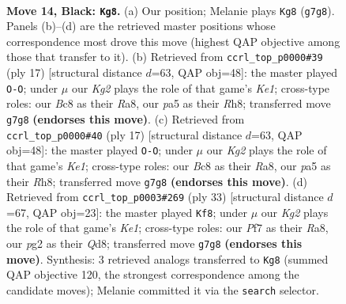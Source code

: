 \documentclass[11pt]{article}
\begin{document}
\clearpage

\begin{figure}[p]\centering
\begin{subfigure}{0.46\textwidth}\centering
\resizebox{\linewidth}{!}{%
\newchessgame
\chessboard[
  setfen={1rbqr3/p1p2pkp/2pp1n2/P3p3/4P3/2PP1N2/2P2PP1/R1BQ1RK1 b - - 0 14},
  showmover=false,
  pgfstyle=straightmove, color=movearrow, markmove={g7-g8}
]}
\caption{}
\end{subfigure}\hfill
\begin{subfigure}{0.46\textwidth}\centering
\resizebox{\linewidth}{!}{%
\newchessgame
\chessboard[
  setfen={r1b1k2r/p1p1qppp/2pp1n2/4p3/4P3/2PP1N1P/P1P2PP1/R1BQ1RK1 b kq - 0 9},
  showmover=false,
  pgfstyle=straightmove, color=movearrow, markmove={e8-g8}
]}
\caption{}
\end{subfigure}
\\[4pt]
\begin{subfigure}{0.46\textwidth}\centering
\resizebox{\linewidth}{!}{%
\newchessgame
\chessboard[
  setfen={r1b1k2r/p1p1qppp/2pp1n2/4p3/4P3/2PP1N1P/P1P2PP1/R1BQ1RK1 b kq - 0 9},
  showmover=false,
  pgfstyle=straightmove, color=movearrow, markmove={e8-g8}
]}
\caption{}
\end{subfigure}\hfill
\begin{subfigure}{0.46\textwidth}\centering
\resizebox{\linewidth}{!}{%
\newchessgame
\chessboard[
  setfen={r2qk2r/pp2bp2/1np5/3p1B1p/3P2p1/2N1P1P1/PPQ2PP1/4RRK1 b kq - 0 17},
  showmover=false,
  pgfstyle=straightmove, color=movearrow, markmove={e8-f8}
]}
\caption{}
\end{subfigure}
\caption{\textbf{Move 14, Black: \texttt{Kg8}.} (a) Our position; Melanie plays \texttt{Kg8} (\texttt{g7g8}). Panels (b)--(d) are the retrieved master positions whose correspondence most drove this move (highest QAP objective among those that transfer to it). (b) Retrieved from \texttt{ccrl\_top\_p0000\#39} (ply 17) [structural distance $d$=63, QAP obj=48]: the master played \texttt{O-O}; under $\mu$ our \emph{Kg2} plays the role of that game's \emph{Ke1}; cross-type roles: our \emph{B}c8 as their \emph{R}a8, our \emph{p}a5 as their \emph{R}h8; transferred move \texttt{g7g8} \textbf{(endorses this move)}. (c) Retrieved from \texttt{ccrl\_top\_p0000\#40} (ply 17) [structural distance $d$=63, QAP obj=48]: the master played \texttt{O-O}; under $\mu$ our \emph{Kg2} plays the role of that game's \emph{Ke1}; cross-type roles: our \emph{B}c8 as their \emph{R}a8, our \emph{p}a5 as their \emph{R}h8; transferred move \texttt{g7g8} \textbf{(endorses this move)}. (d) Retrieved from \texttt{ccrl\_top\_p0003\#269} (ply 33) [structural distance $d$=67, QAP obj=23]: the master played \texttt{Kf8}; under $\mu$ our \emph{Kg2} plays the role of that game's \emph{Ke1}; cross-type roles: our \emph{P}f7 as their \emph{R}a8, our \emph{p}g2 as their \emph{Q}d8; transferred move \texttt{g7g8} \textbf{(endorses this move)}. Synthesis: 3 retrieved analogs transferred to \texttt{Kg8} (summed QAP objective 120, the strongest correspondence among the candidate moves); Melanie committed it via the \texttt{search} selector.}
\label{fig:thought-m27}
\end{figure}
\end{document}
